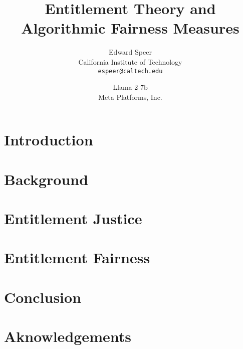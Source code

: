 \documentclass[11pt, a4paper, hyphens]{article}
\title{Entitlement Theory and Algorithmic Fairness Measures}
\author{%
  Edward Speer
  \\
  California Institute of Technology\\
  \texttt{espeer@caltech.edu} \\
   \and
  Llama-2-7b \\
  Meta Platforms, Inc. \\
}
\date{\monthyeardate}
\begin{document}
\maketitle

\begin{abstract}
    
\end{abstract}

\section{Introduction}\label{sec:introduction}


\section{Background}\label{sec:background}


\section{Entitlement Justice}\label{sec:entitlement-justice}


\section{Entitlement Fairness}\label{sec:entitlement-fairness}


\section{Conclusion}\label{sec:conclusion}


\section*{Aknowledgements}\label{sec:acknowledgements}


\end{document}
